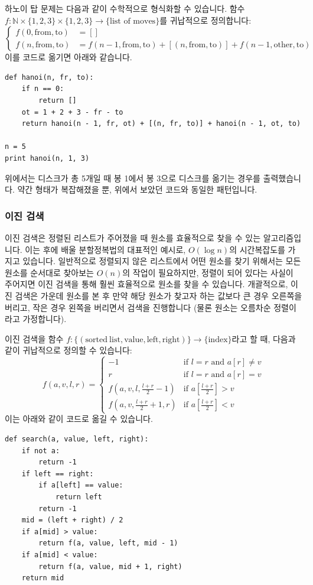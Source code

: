 \documentclass[../main.tex]{subfiles}
\begin{document}
하노이 탑 문제는 다음과 같이 수학적으로 형식화할 수 있습니다.
함수 $f: \mathbb{N} \times \{1, 2, 3\} \times \{1, 2, 3\} \rightarrow \{\text{list of moves}\}$를 귀납적으로 정의합니다:
\[
\begin{cases}f(0, \mathrm{from}, \mathrm{to}) &= []\\
f(n, \mathrm{from}, \mathrm{to}) &= f(n - 1, \mathrm{from}, \mathrm{to}) + [(n, \mathrm{from}, \mathrm{to})] + f(n - 1, \mathrm{other}, \mathrm{to})\end{cases}
\]
이를 코드로 옮기면 아래와 같습니다.
\begin{verbatim}
def hanoi(n, fr, to):
	if n == 0:
		return []
	ot = 1 + 2 + 3 - fr - to
	return hanoi(n - 1, fr, ot) + [(n, fr, to)] + hanoi(n - 1, ot, to)

n = 5
print hanoi(n, 1, 3)
\end{verbatim}
위에서는 디스크가 총 5개일 때 봉 1에서 봉 3으로 디스크를 옮기는 경우를 출력했습니다.
약간 형태가 복잡해졌을 뿐, 위에서 보았던 코드와 동일한 패턴입니다.

\subsubsection{이진 검색}
이진 검색은 정렬된 리스트가 주어졌을 때 원소를 효율적으로 찾을 수 있는 알고리즘입니다.
이는 후에 배울 분할정복법의 대표적인 예시로, $O(\log n)$의 시간복잡도를 가지고 있습니다.
일반적으로 정렬되지 않은 리스트에서 어떤 원소를 찾기 위해서는 모든 원소를 순서대로 찾아보는 $O(n)$의 작업이 필요하지만, 정렬이 되어 있다는 사실이 주어지면 이진 검색을 통해 훨씬 효율적으로 원소를 찾을 수 있습니다.
개괄적으로, 이진 검색은 가운데 원소를 본 후 만약 해당 원소가 찾고자 하는 값보다 큰 경우 오른쪽을 버리고, 작은 경우 왼쪽을 버리면서 검색을 진행합니다 (물론 원소는 오름차순 정렬이라고 가정합니다).

이진 검색을 함수 $f: \{(\mathrm{sorted\ list}, \mathrm{value}, \mathrm{left}, \mathrm{right})\} \rightarrow \{\mathrm{index}\}$라고 할 때, 다음과 같이 귀납적으로 정의할 수 있습니다:
\[
f(a, v, l, r) = \begin{cases}
-1 & \text{if } l = r \text{ and } a[r] \neq v\\
r & \text{if } l = r \text{ and } a[r] = v\\
f\left(a, v, l, \frac{l + r}{2} - 1\right) & \text{if } a\left[\frac{l + r}{2}\right] > v\\
f\left(a, v, \frac{l + r}{2} + 1, r\right) & \text{if } a\left[\frac{l + r}{2}\right] < v
\end{cases}
\]
이는 아래와 같이 코드로 옮길 수 있습니다.
\begin{verbatim}
def search(a, value, left, right):
	if not a:
		return -1
	if left == right:
		if a[left] == value:
			return left
		return -1
	mid = (left + right) / 2
	if a[mid] > value:
		return f(a, value, left, mid - 1)
	if a[mid] < value:
		return f(a, value, mid + 1, right)
	return mid
\end{verbatim}
\end{document}
